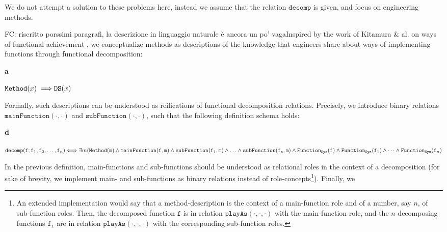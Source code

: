 \documentclass[sw]{iosart2x}
\newcommand{\bflist}{\begin{list}{}{\setlength{\topsep}{2mm}\setlength{\partopsep}{0mm}\setlength{\parsep}{0mm}\setlength{\leftmargin}{9mm}\setlength{\labelwidth}{8mm}}}
\newcommand{\eflist}{\end{list}}
\newcommand{\AxLabel}{\textrm{a}}
\newcommand{\DefLabel}{\textrm{d}}
\newcounter{cntax}
\newcommand{\myax}[1]{\refstepcounter{cntax}\begin{small}{\bf \AxLabel\thecntax\label{ax:#1}}\end{small}}
\newcounter{cntdef}
\newcommand{\mydf}[1]{\refstepcounter{cntdef}\begin{small}{\bf \DefLabel\thecntdef\label{def:#1}}\end{small}}
\newcommand{\generalStyle}[1]{\texttt{#1}}
\newcommand{\biRel}[3]{\generalStyle{#1}(#2,#3)}
\newcommand{\uniRel}[2]{\generalStyle{#1}(#2)}
\newcommand{\uniRelPar}[3]{\generalStyle{#1}_{\generalStyle{#3}}(#2)}
\newcommand{\triRel}[4]{\generalStyle{#1}(#2,#3,#4)}
\newcommand{\cst}[1]{\ensuremath{\mathtt{#1}}}
\newcommand{\myiff}{\Longleftrightarrow}
\newcommand{\myfi}{\hspace{0.9mm} \Longrightarrow}
\newcommand{\DOLCEDescription}[1]{\uniRel{{DS}}{#1}}
\newcommand{\DOLCENASO}[1]{\uniRel{{NASO}}{#1}}
\newcommand{\Method}[1]{\uniRel{Method}{#1}}
\newcommand{\FunctionSys}[1]{\uniRelPar{Function}{#1}{Sys}}
\newcommand{\mainFunction}[2]{\biRel{mainFunction}{#1}{#2}}
\newcommand{\subFunction}[2]{\biRel{subFunction}{#1}{#2}}
\newcommand{\playAs}[3]{\triRel{playAs}{#1}{#2}{#3}}
\newcommand{\decom}{\generalStyle{decomp}}
\newcommand{\TODO}[1]{{\color{red} #1}}
\begin{document}
We do not attempt a solution to these problems here,
instead we assume that the relation $\decom$ is given, and focus on engineering methods. %

\TODO{FC: riscritto porssimi paragrafi, la descrizione in linguaggio naturale è ancora un po' vaga}Inspired by the work of Kitamura \& al. on ways of functional achievement \cite{kitamuraOntologicalModelDevice2006, kitamuraOntologybasedDescriptionFunctional2003}, we conceptualize methods as descriptions  of the knowledge that engineers share about ways of implementing functions through functional decomposition:
\bflist
  \item[\myax{methodSubs}] $ \Method{x} \myfi \DOLCEDescription{x}$%
\eflist
Formally, such descriptions can be understood as reifications of functional decomposition relations.
Precisely, we introduce binary relations $\mainFunction{\cdot}{\cdot}$ and $\subFunction{\cdot}{\cdot}$, such that the following definition schema holds:
\bflist
  \item[\mydf{method}] $\decom(\cst{f};\cst{f}_1,\cst{f}_2,\dots,\cst{f}_n) \myiff \\ \exists m (\Method{\cst{m}} \land \mainFunction{\cst{f}}{\cst{m}} \land \subFunction{\cst{f_1}}{\cst{m}} \land \ldots \land \subFunction{\cst{f_n}}{\cst{m}} \land \FunctionSys{\cst{f}} \land \FunctionSys{\cst{f}_1} \land \dots \land \FunctionSys{\cst{f}_n}
 $
\eflist
In the previous definition, main-functions and sub-functions should be understood as relational roles in the context of a decomposition (for sake of brevity, we implement main- and sub-functions as binary relations instead of role-concepts\footnote{An extended implementation would say that a method-description is the context of a main-function role and of a number, say $n$, of sub-function roles. Then, the decomposed function $\cst{f}$ is in relation $\playAs{\cdot}{\cdot}{\cdot}$ with the main-function role, and the $n$ decomposing functions $\cst{f_i}$ are in relation $\playAs{\cdot}{\cdot}{\cdot}$ with the corresponding sub-function roles.}).
Finally, we 
\end{document}
